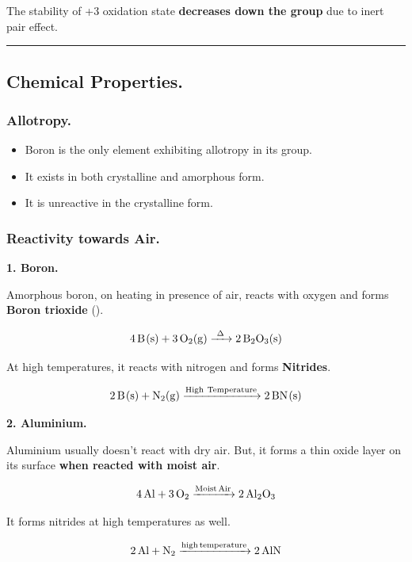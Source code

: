 \documentclass[twocolumn]{article}
\begin{document}
The stability of +3 oxidation state \textbf{decreases down the group} due to inert pair effect. 

\vspace*{0.1in}
\hrule

\subsection*{Chemical Properties.}

\subsubsection*{Allotropy.}

\begin{itemize}
    \item Boron is the only element exhibiting allotropy in its group. 
    \item It exists in both crystalline and amorphous form.
    \item It is unreactive in the crystalline form. 
\end{itemize}

\subsubsection*{Reactivity towards Air.}

\textbf{1. Boron.} 
\vspace*{0.1in} 

Amorphous boron, on heating in presence of air, reacts with oxygen and forms \textbf{Boron trioxide} ().

\[
    \ce{ 4B(s) + 3O2(g) ->[\Delta] 2B2O3(s) } 
\]

At high temperatures, it reacts with nitrogen and forms \textbf{Nitrides}. 

\[
    \ce{ 2B(s) + N2(g) ->[High\ Temperature] 2BN(s) } 
\]

\vspace*{0.2in} 

\textbf{2. Aluminium.} 
\vspace*{0.1in} 

Aluminium usually doesn't react with dry air. But, it forms a thin oxide layer on its surface \textbf{when reacted with moist air}.  

\[
    \ce{ 4Al + 3O2 ->[Moist Air] 2Al2O3 } 
\]

It forms nitrides at high temperatures as well.  

\[
    \ce{  2Al + N2 ->[high temperature] 2AlN}
\]
\end{document}
